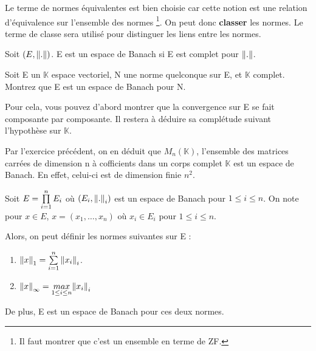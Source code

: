 Le terme de normes équivalentes est bien choisie car cette notion est une
relation d'équivalence sur l'ensemble des normes \footnote{Il faut montrer que
c'est un ensemble en terme de ZF.}.
On peut donc \textbf{classer} les normes. Le terme de classe sera utilisé pour
distinguer les liens entre les normes.

\begin{definition}
	Soit $(E, \norm{.})$. E est un espace de Banach si E est
	complet pour $\norm{.}$.
\end{definition}

\begin{exercice}
	Soit E un $\mathbb{K}$ espace vectoriel, N une norme quelconque sur E, et
	$\mathbb{K}$ complet. 
	Montrez que E est un espace de Banach pour N.
	
	Pour cela, vous pouvez d'abord montrer que la convergence sur E se fait
	composante par composante. Il restera à déduire sa complétude suivant
	l'hypothèse sur $\mathbb{K}$.
\end{exercice}

\begin{exemple}
	Par l'exercice précédent, on en déduit que $M_{n}(\mathbb{K})$, l'ensemble
	des matrices carrées de dimension n à cofficients dans un corps complet
	$\mathbb{K}$ est un espace de Banach. En effet, celui-ci est de dimension
	finie $n^{2}$.
\end{exemple}


\begin{proposition}
	\label{product_norm_space}
	Soit $E = \prod\limits_{i = 1}^{n} E_{i}$ où $(E_{i}, \norm{.}_{i})$
	est un espace de Banach pour $1 \leq i \leq n$.
	On note pour $x \in E$, $x = (x_{1}, \ldots, x_{n})$ où $x_{i} \in
	E_{i}$ pour $1 \leq i \leq n$.
	
	Alors, on peut définir les normes suivantes sur E :
	\begin{enumerate}
		\item $\norm{x}_{1} = \sum\limits_{i = 1}^{n} \norm{x_{i}}_{i}$.
		\item $\norm{x}_{\infty} = \underset{1 \leq i \leq
			n}{max} \norm{x_{i}}_{i}$
	\end{enumerate}

	De plus, E est un espace de Banach pour ces deux normes.
\end{proposition}

